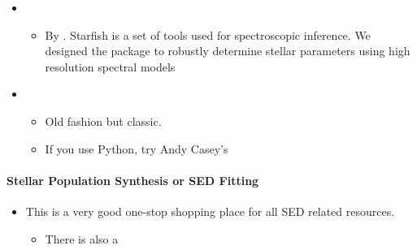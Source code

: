 \documentclass[letterpaper,10pt,english]{sphinxmanual}
\begin{document}
\begin{itemize}
\begin{itemize}
\end{itemize}

\item {} 
\begin{itemize}
\item {} 
By . Starfish is a set
of tools used for spectroscopic inference. We designed the package
to robustly determine stellar parameters using high resolution
spectral models

\end{itemize}

\item {} 
\begin{itemize}
\item {} 
Old fashion but classic.

\item {} 
If you use Python, try Andy Casey’s 

\end{itemize}

\end{itemize}


\paragraph{Stellar Population Synthesis or SED Fitting}
\label{\detokenize{resource/astro/topics/stellar_and_spops:stellar-population-synthesis-or-sed-fitting}}\begin{itemize}
\item {} 
This 
is a very good one-stop shopping place for all SED related resources.
\begin{itemize}
\item {} 
There is also a 

\end{itemize}

\end{itemize}
\end{document}
